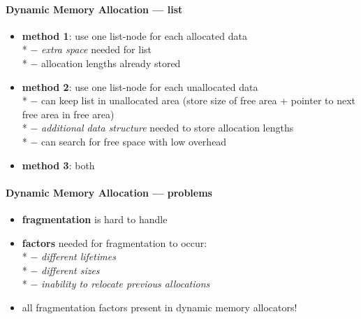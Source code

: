 \paragraph{Dynamic Memory Allocation --- list}
\begin{itemize}
  \item \textbf{method 1}: use one list-node for each allocated data \\*
    $ - $ \emph{extra space} needed for list \\*
    $ - $ allocation lengths already stored
  \item \textbf{method 2}: use one list-node for each unallocated data \\*
    $ - $ can keep list in unallocated area (store size of free area + pointer to next free area in free area) \\*
    $ - $ \emph{additional data structure} needed to store allocation lengths \\*
    $ - $ can search for free space with low overhead
  \item \textbf{method 3}: both
\end{itemize}

\paragraph{Dynamic Memory Allocation --- problems}
\begin{itemize}
  \item \textbf{fragmentation} is hard to handle
  \item \textbf{factors} needed for fragmentation to occur: \\*
    $ - $ \emph{different lifetimes} \\*
    $ - $ \emph{different sizes} \\*
    $ - $ \emph{inability to relocate previous allocations}
  \item all fragmentation factors present in dynamic memory allocators!
\end{itemize}

